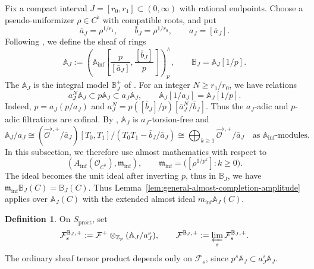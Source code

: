 \documentclass[11pt]{article}
\theoremstyle{definition}
\newtheorem{definition}[theorem]{Definition}
\newcommand{\Zp}{\mathbb Z_p}
\newcommand{\cO}{\mathcal O}
\newcommand{\proet}{\mathrm{pro\acute et}}
\begin{document}
Fix a compact interval \(J=[r_0,r_1]\subset(0,\infty)\)
with rational endpoints.  Choose a pseudo-uniformizer
\(\rho\in C^\flat\) with compatible roots, and put
\begin{equation*}
 \bar{a}_J=\rho^{1/r_1},\qquad
 \bar{b}_J=\rho^{1/r_0},\qquad a_J=[\bar{a}_J].
\end{equation*}
Following \cite[Definition~4.4]{BoscoDrinfeld}, we define the sheaf of rings
\begin{equation*}
 \mathbb A_J
 :=\left(\mathbb A_{\inf}
       \left[\frac p{[\bar{a}_J]},\frac{[\bar{b}_J]}p\right]
       \right)^\wedge_p,
 \qquad \mathbb B_J=\mathbb A_J[1/p].
\end{equation*}
The $\mathbb{A}_J$ is the integral model \(\mathbb B_J^+\) of
\cite[Theorem~2.2.4 and its proof]{DRC}.
For an integer \(N\geq r_1/r_0\), we have relations
\begin{equation}\label{eq:period-cofinal-filtrations}
 a_J^N\mathbb A_J\subset p\mathbb A_J\subset a_J\mathbb A_J,
 \qquad
 \mathbb A_J[1/a_J]=\mathbb A_J[1/p].
\end{equation}
Indeed, \(p=a_J(p/a_J)\) and
\(a_J^N=p([\bar{b}_J]/p)[\bar{a}_J^N/\bar{b}_J]\).
Thus the \(a_J\)-adic and \(p\)-adic filtrations are cofinal.
By \cite[Theorem~2.2.4 and Corollary~2.2.11]{DRC},
\(\mathbb A_J\) is \(a_J\)-torsion-free and
\[
 \mathbb A_J/a_J
 \cong
 (\widehat{\mathscr O}^{\flat,+}/\bar{a}_J)
 [T_0,T_1]/(T_0T_1-\bar{b}_J/\bar{a}_J)
\cong\bigoplus_{k\geq1}
       \widehat{\mathscr O}^{\flat,+}/\bar{a}_J
 \quad\text{as }\mathbb A_{\inf}\text{-modules}.
 \label{eq:period-annulus-free-reduction}
\]
In this subsection, we therefore use almost mathematics with respect to
\begin{equation*}
 \left(A_{\inf}(\cO_{C^\flat}),\mathfrak m_{\inf}\right),
 \qquad
 \mathfrak m_{\inf}
   =\bigl([\rho^{1/p^k}]:k\geq0\bigr).
\end{equation*}
The ideal becomes the unit ideal after inverting $p$, thus in $\mathbb{B}_J$, we have
\(
 \mathfrak m_{\inf}\mathbb B_J(C)=\mathbb B_J(C).
\)
Thus Lemma~\ref{lem:general-almost-completion-amplitude} applies
over \(\mathbb A_J(C)\) with the extended almost ideal $m_{\inf}\mathbb A_J(C)$.


\begin{definition}%
\label{def:general-period-coefficients}
On \(S_{\proet}\), set
\[
 \mathcal F_s^{\mathbb B_J,+}
 :=\mathcal F^+\otimes_{\Zp}(\mathbb A_J/a_J^s),
 \qquad
 \mathcal F^{\mathbb B_J,+}
 :=\varprojlim_s\mathcal F_s^{\mathbb B_J,+}.
\]
The ordinary sheaf tensor product depends only on
\(\mathcal F_s\), since \(p^s\mathbb A_J\subset a_J^s\mathbb A_J\).
\end{definition}
\end{document}
